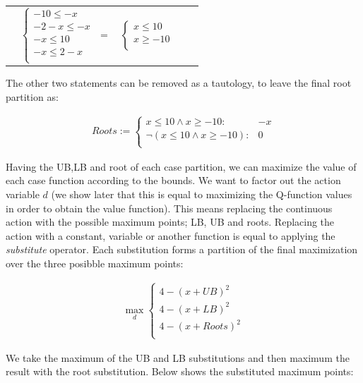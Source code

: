\documentclass[letterpaper]{article}
\begin{document}
{\footnotesize
\begin{center}
\begin{tabular}{r c c c l}
&
\hspace{-9mm} $
  \begin{cases}
-10 \leq -x \\ 
-2 -x \leq -x \\ 
-x \leq 10 \\ 
-x \leq 2 -x\\ 
  \end{cases}$
$=$
&
\hspace{-4mm}
$ \begin{cases}
x \leq 10 \\ 
x \geq -10\\ 
  \end{cases}$
\end{tabular}
\end{center}
}
The other two statements can be removed as a tautology, to leave the final root partition as: 

\begin{align*}Roots:= 
 \begin{cases}
x \leq 10 \wedge x \geq -10:              & -x\\ 
\neg (x \leq 10 \wedge x \geq -10):    & 0\\ 
  \end{cases}
\end{align*}

Having the UB,LB and root of each case partition, we can maximize the value of each case function according to the bounds. We want to factor out the action variable $d$ (we show later that this is equal to maximizing the Q-function values in order to obtain the value function). This means replacing the continuous action with the possible maximum points; LB, UB and roots. Replacing the action with a constant, variable or another function is equal to applying the \emph{substitute} operator. Each substitution forms a partition of the final maximization over the three posibble maximum points: 

\begin{align*}
\max_{d}
\begin{cases}
4 - (x+ UB)^2 \\ 
4- (x+LB)^2 \\ 
4 - (x+Roots)^2\\ 
  \end{cases}
\end{align*}

We take the maximum of the UB and LB  substitutions and then maximum the result with the root substitution. Below shows the substituted maximum points:
\end{document}
